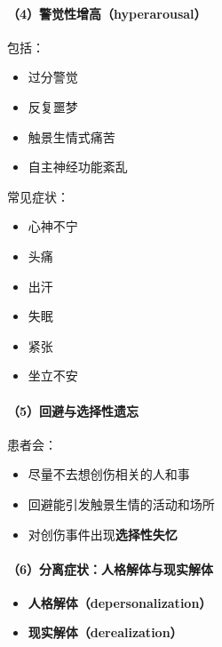 \documentclass[
  chinese,
  9pt,
  a4paper,
]{ctexart}
\providecommand{\tightlist}{%
  \setlength{\itemsep}{0pt}\setlength{\parskip}{0pt}}
\begin{document}
\paragraph{（4）警觉性增高（hyperarousal）}\label{ux8b66ux89c9ux6027ux589eux9ad8hyperarousal}

包括：

\begin{itemize}
\tightlist
\item
  过分警觉
\item
  反复噩梦
\item
  触景生情式痛苦
\item
  自主神经功能紊乱
\end{itemize}

常见症状：

\begin{itemize}
\tightlist
\item
  心神不宁
\item
  头痛
\item
  出汗
\item
  失眠
\item
  紧张
\item
  坐立不安
\end{itemize}

\paragraph{（5）回避与选择性遗忘}\label{ux56deux907fux4e0eux9009ux62e9ux6027ux9057ux5fd8}

患者会：

\begin{itemize}
\tightlist
\item
  尽量不去想创伤相关的人和事
\item
  回避能引发触景生情的活动和场所
\item
  对创伤事件出现\textbf{选择性失忆}
\end{itemize}

\paragraph{（6）分离症状：人格解体与现实解体}\label{ux5206ux79bbux75c7ux72b6ux4ebaux683cux89e3ux4f53ux4e0eux73b0ux5b9eux89e3ux4f53}

\begin{itemize}
\tightlist
\item
  \textbf{人格解体（depersonalization）}
\item
  \textbf{现实解体（derealization）}
\end{itemize}
\end{document}
